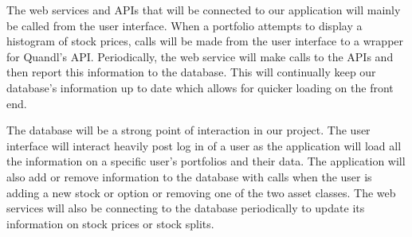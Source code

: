 \documentclass[onecolumn, draftclsnofoot,10pt, compsoc]{IEEEtran}
\begin{document}
    The web services and APIs that will be connected to our application will mainly be called from the user
    interface. When a portfolio attempts to display a histogram of stock prices, calls will be made from the user
    interface to a wrapper for Quandl's API. Periodically, the web service will make calls to the APIs and 
    then report this information to the database. This will continually keep our database's information
    up to date which allows for quicker loading on the front end.
    
    The database will be a strong point of interaction in our project. The user interface will interact heavily
    post log in of a user as the application will load all the information on a specific user's portfolios and their
    data. The application will also add or remove information to the database with calls when the user is adding 
    a new stock or option or removing one of the two asset classes. The web services will also be connecting
    to the database periodically to update its information on stock prices or stock splits.
    
    
\end{document}
